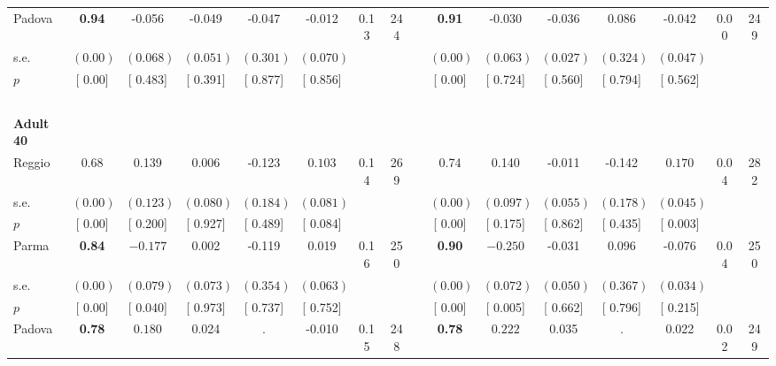\begin{longtable}{L{8em} c c c c c c c p{1em} c c c c c c c}
\quad \quad \quad Padova& \textbf{     0.94} &    -0.056 &    -0.049 &    -0.047 &    -0.012 &      0.13 &       244 & & \textbf{     0.91} &    -0.030 &    -0.036 &     0.086 &    -0.042 &      0.00 &       249  \\*
\quad \quad \quad \quad s.e.& $ (     0.00)$ & $ (    0.068)$ & $ (    0.051)$ & $ (    0.301)$ & $ (    0.070)$ & & & & $ (     0.00)$ & $ (    0.063)$ & $ (    0.027)$ & $ (    0.324)$ & $ (    0.047)$ & &  \\*
\quad \quad \quad \quad $ p$ & [     0.00] & [    0.483] & [    0.391] & [    0.877] & [    0.856] & & & & [     0.00] & [    0.724] & [    0.560] & [    0.794] & [    0.562] & &  \\[1em]
~\\[1em]
\quad \quad \textbf{Adult 40} & & & & & & & & & & & & & & & \\* 
\quad \quad \quad Reggio& 0.68 &     0.139 &     0.006 &    -0.123 & $ \mathbf{    0.103}$ &      0.14 &       269 & & 0.74 &     0.140 &    -0.011 &    -0.142 & $ \mathbf{    0.170}$ &      0.04 &       282  \\*
\quad \quad \quad \quad s.e.& $ (     0.00)$ & $ (    0.123)$ & $ (    0.080)$ & $ (    0.184)$ & $ (    0.081)$ & & & & $ (     0.00)$ & $ (    0.097)$ & $ (    0.055)$ & $ (    0.178)$ & $ (    0.045)$ & &  \\*
\quad \quad \quad \quad $ p$ & [     0.00] & [    0.200] & [    0.927] & [    0.489] & [    0.084] & & & & [     0.00] & [    0.175] & [    0.862] & [    0.435] & [    0.003] & &  \\[1em]
\quad \quad \quad Parma& \textbf{     0.84} & $ \mathbf{   -0.177}$ &     0.002 &    -0.119 &     0.019 &      0.16 &       250 & & \textbf{     0.90} & $ \mathbf{   -0.250}$ &    -0.031 &     0.096 &    -0.076 &      0.04 &       250  \\*
\quad \quad \quad \quad s.e.& $ (     0.00)$ & $ (    0.079)$ & $ (    0.073)$ & $ (    0.354)$ & $ (    0.063)$ & & & & $ (     0.00)$ & $ (    0.072)$ & $ (    0.050)$ & $ (    0.367)$ & $ (    0.034)$ & &  \\*
\quad \quad \quad \quad $ p$ & [     0.00] & [    0.040] & [    0.973] & [    0.737] & [    0.752] & & & & [     0.00] & [    0.005] & [    0.662] & [    0.796] & [    0.215] & &  \\[1em]
\quad \quad \quad Padova& \textbf{     0.78} & $ \mathbf{    0.180}$ &     0.024 &         . &    -0.010 &      0.15 &       248 & & \textbf{     0.78} & $ \mathbf{    0.222}$ &     0.035 &         . &     0.022 &      0.02 &       249  \\*

\end{longtable}
